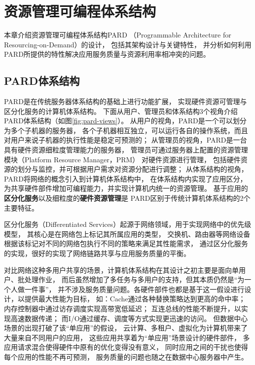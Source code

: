 

\chapter{资源管理可编程体系结构}
\label{chap:pardarch}

本章介绍资源管理可编程体系结构PARD
（Programmable Architecture for Resourcing-on-Demand）\cite{pard:2015}的设计，
包括其架构设计与关键特性，
并分析如何利用PARD所提供的特性解决应用服务质量与资源利用率相冲突的问题。


\section{PARD体系结构}

PARD是在传统服务器体系结构的基础上进行功能扩展，
实现硬件资源可管理与区分化服务的计算机体系结构。
下面从用户、管理员和体系结构3个视角介绍PARD体系结构（如图\ref{fig:pard-views}）。
从用户的视角，PARD是一个可以划分为多个子机器的服务器，
各个子机器相互独立，可以运行各自的操作系统，而且对用户来说子机器的执行性能是稳定可预测的；
从管理员的视角，PARD是一台具有硬件资源细粒度管理能力的服务器，
管理员可通过服务器上配置的资源管理模块（Platform Resource Manager，PRM）
对硬件资源进行管理，
包括硬件资源的划分与监控，并可根据用户需求对资源分配进行调整；
从体系结构的视角，PARD将网络的概念引入到计算机体系结构中，
在体系结构内实现了应用区分，为共享硬件部件增加可编程能力，并实现计算机内统一的资源管理。
基于应用的\textbf{区分化服务}以及细粒度的\textbf{硬件资源管理}是
PARD区别于传统计算机体系结构的2个主要特征。

区分化服务（Differentiated Services）起源于网络领域，用于实现网络中的优先级模型，
其核心是在网络包上标记其所属应用的类型，
交换机、路由器等网络设备根据该标记对不同的网络包执行不同的策略来满足其性能需求，
通过区分化服务的实现，很好的实现了网络链路共享与应用服务质量的平衡。

对比网络这种多用户共享的场景，计算机体系结构在其设计之初主要是面向单用户、批处理作业，
而后虽然增加了多任务与多用户的支持，但其本质仍然是``为一个人做一件事''，
并不涉及服务质量问题。各硬件部件也都是基于这一假设进行设计，以提供最大性能为目标，
如：Cache通过各种替换策略达到更高的命中率；
内存控制器中通过访存调度实现高带宽低延迟；
互连总线的性能不断提升，以实现高速数据传递；
而I/O通过缓存、调度等方式实现更迅速的访问。
但数据中心场景的出现打破了该``单应用''的假设，
云计算、多租户、虚拟化为计算机带来了大量来自不同用户的应用，
这些应用共享着为``单应用''场景设计的硬件部件，
多应用请求混合使得硬件中原有的优化变得没有意义，
同时应用之间的干扰也使得每个应用的性能不再可预测，
服务质量的问题也随之在数据中心服务器中产生。

